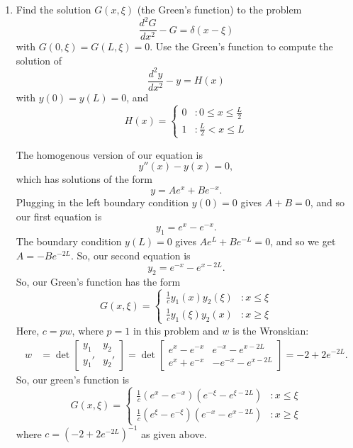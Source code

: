 \documentclass[10pt,letterpaper]{report}
\newcommand{\mtx}[2]{\left[\begin{array}{#1}#2\end{array}\right]}
\begin{document}
\begin{enumerate}
\item \begin{qbox}
Find the solution $G(x, \xi)$ (the Green's function) to the problem
\[
\frac{d^2G}{dx^2} - G = \delta(x - \xi)
\]
with $G(0,\xi) = G(L, \xi) = 0$. Use the Green's function to compute the solution of
\[
\frac{d^2y}{dx^2} - y = H(x)
\]
with $y(0) = y(L) = 0$, and 
\[
H(x) = \begin{cases}
0 &: 0 \leq x \leq \frac L 2 \\
1 &: \frac L 2 < x \leq L
\end{cases}
\]
\end{qbox}
The homogenous version of our equation is
\[
y''(x) - y(x) = 0,
\]
which has solutions of the form
\[
y = Ae^x + Be^{-x}.
\]
Plugging in the left boundary condition $y(0) = 0$ gives $A + B = 0$, and so our first equation is
\[
y_1 = e^x - e^{-x}.
\]
The boundary condition $y(L) = 0$ gives $Ae^L + Be^{-L} = 0$, and so we get $A = -B e^{-2L}$. So, our second equation is
\[
y_2 = e^{-x} - e^{x-2L}.
\]
So, our Green's function has the form
\[
G(x, \xi) = \begin{cases}
\frac{1}{c}y_1(x)y_2(\xi) &: x \leq \xi
\\
\frac{1}{c}y_1(\xi)y_2(x) &: x \geq \xi
\end{cases}
\]
Here, $c = pw$, where $p = 1$ in this problem and $w$ is the Wronskian:
\begin{align*}
    w &= \det \mtx{cc}{y_1 & y_2 \\ y_1' & y_2'}
    =
    \det \mtx{cc}{e^x - e^{-x} & e^{-x} - e^{x-2L} \\ e^x + e^{-x} & -e^{-x} - e^{x-2L}}
    =
    -2 + 2e^{-2L}.
\end{align*}
So, our green's function is
\[
G(x, \xi) = \begin{cases}
\frac{1}{c}\left(e^{x} - e^{-x}\right)\left(e^{-\xi} - e^{\xi-2L}\right) &: x \leq \xi
\\
\frac{1}{c}\left(e^{\xi} - e^{-\xi}\right)\left(e^{-x} - e^{x-2L}\right) &: x \geq \xi
\end{cases}
\]
where $c = \left(-2 + 2e^{-2L}\right)^{-1}$ as given above.


\end{enumerate}
\end{document}
